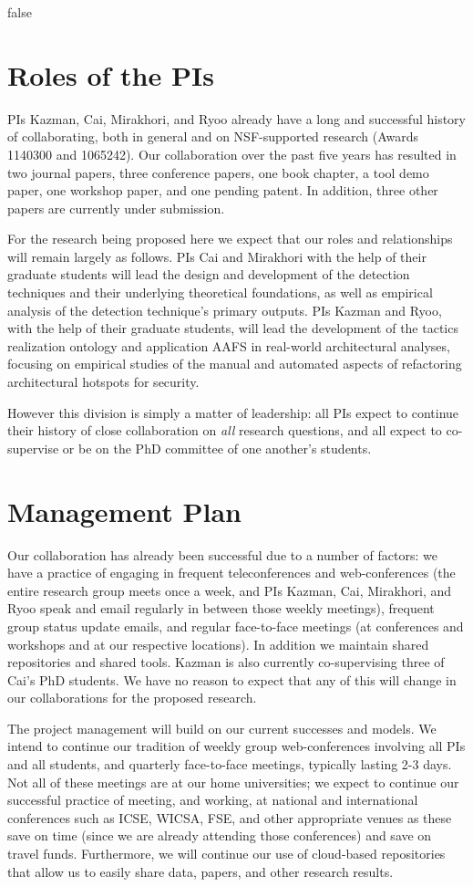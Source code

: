 \if false
\section{Roles of the PIs}
PIs Kazman, Cai, Mirakhori, and Ryoo already have a long and successful history of collaborating, both in general and on NSF-supported research (Awards 1140300 and 1065242).  Our collaboration over the past five years has resulted in two journal papers, three conference papers, one book chapter, a tool demo paper, one workshop paper, and one pending patent. In addition, three other papers are currently under submission.  

For the research being proposed here we expect that our roles and relationships will remain largely as follows.  PIs Cai and Mirakhori with the help of their graduate students will lead the design and development of the detection techniques and their underlying theoretical foundations, as well as empirical analysis of the detection technique's primary outputs. PIs Kazman and Ryoo, with the help of their graduate students, will lead the development of the tactics realization ontology and application AAFS in real-world architectural analyses, focusing on empirical studies of the manual and automated aspects of refactoring architectural hotspots for security.  

However this division is simply a matter of leadership: all PIs expect to continue their history of close collaboration on {\em all} research questions, and all expect to co-supervise or be on the PhD committee of one another's students.   


\section{Management Plan}
Our collaboration has already been successful due to a number of factors: we have a practice of engaging in frequent teleconferences and web-conferences (the entire research group meets once a week, and PIs Kazman, Cai, Mirakhori, and Ryoo speak and email regularly in between those weekly meetings), frequent group status update emails, and regular face-to-face meetings (at conferences and workshops and at our respective locations).  In addition we maintain shared repositories and shared tools.  Kazman is also currently co-supervising three of Cai's PhD students.   We have no reason to expect that any of this will change in our collaborations for the proposed research.

The project management will build on our current successes and models.  We intend to continue our tradition of weekly group web-conferences involving all PIs and all students, and quarterly face-to-face meetings, typically lasting 2-3 days. Not all of these meetings are at our home universities; we expect to continue our successful practice of meeting, and working, at national and international conferences such as ICSE, WICSA, FSE, and other appropriate venues as these save on time (since we are already attending those conferences) and save on travel funds.  Furthermore, we will continue our use of cloud-based repositories that allow us to easily share data, papers, and other research results.

